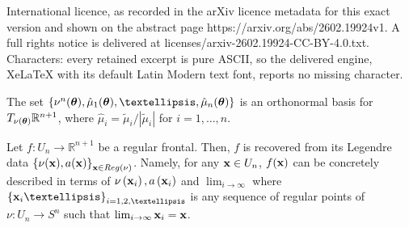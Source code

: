 \documentclass[10pt,a4paper]{amsart}
\begin{document}
International licence, as recorded in the arXiv licence metadata for this exact version and shown on the abstract page https://arxiv.org/abs/2602.19924v1. A full rights notice is delivered at licenses/arxiv-2602.19924-CC-BY-4.0.txt. Characters: every retained excerpt is pure ASCII, so the delivered engine, XeLaTeX with its default Latin Modern text font, reports no missing character.
\begin{proposition}\label{nu mu orthonormal basis}
	The set $\{\nu^n({\color{black}\boldsymbol{\theta}}),
	\hat\mu_1({\color{black}\boldsymbol{\theta}}),
	\dots,\hat\mu_n({\color{black}\boldsymbol{\theta}})\}$ 
	is an orthonormal basis for $T_{\nu({\color{black}\boldsymbol{\theta}})}
	\mathbb{R}^{n+1}$, where $\hat\mu_i=\tilde\mu_i/|\tilde\mu_i|$ for $i=1,\dots,n$.
\end{proposition}

\begin{theorem}\label{theorem1}
Let $f: U_n\to \mathbb{R}^{n+1}$ be a {regular} frontal.   
Then, $f$ is recovered from its Legendre data 
$\left\{\nu({\color{black}\bf x}), 
a({\color{black}\bf x})\right\}_{{\color{black}\bf x}\in Reg({\color{black}\nu})}$.   
{\color{black} 
Namely, for any ${\color{black}\bf x}\in U_n$, 
$f({\color{black}\bf x})$ can be concretely described in terms of 
$\nu\left({\color{black}\bf x}_i\right), 
a\left({\color{black}\bf x}_i\right)$ and $\lim_{i\to \infty}$ where 
$\left\{{\color{black}\bf x}_i\ldots\right\}_{i=1, 2, \ldots}$ 
is any sequence of regular points of $\nu: U_n\to S^n$ 
such that $\lim_{i\to \infty}{\color{black}\bf x}_i={\color{black}\bf x}$.     
}
\end{theorem}
\end{document}
